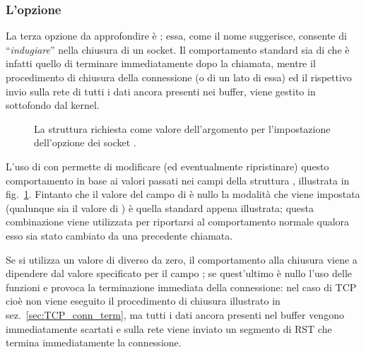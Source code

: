 


\subsubsection{L'opzione }

La terza opzione da approfondire è ; essa, come il nome
suggerisce, consente di ``\textsl{indugiare}'' nella chiusura di un socket. Il
comportamento standard sia di  che  è infatti
quello di terminare immediatamente dopo la chiamata, mentre il procedimento di
chiusura della connessione (o di un lato di essa) ed il rispettivo invio sulla
rete di tutti i dati ancora presenti nei buffer, viene gestito in sottofondo
dal kernel.

\begin{figure}[!htb]
  \footnotesize \centering
  \begin{minipage}[c]{0.80\textwidth}
  \end{minipage}
  \caption{La struttura  richiesta come valore dell'argomento
     per l'impostazione dell'opzione dei socket
    .}
  \label{fig:sock_linger_struct}
\end{figure}

L'uso di  con  permette di modificare (ed
eventualmente ripristinare) questo comportamento in base ai valori passati nei
campi della struttura , illustrata in
fig.~\ref{fig:sock_linger_struct}.  Fintanto che il valore del campo
 di  è nullo la modalità che viene impostata
(qualunque sia il valore di ) è quella standard appena
illustrata; questa combinazione viene utilizzata per riportarsi al
comportamento normale qualora esso sia stato cambiato da una precedente
chiamata.

Se si utilizza un valore di  diverso da zero, il comportamento
alla chiusura viene a dipendere dal valore specificato per il campo
; se quest'ultimo è nullo l'uso delle funzioni  e
 provoca la terminazione immediata della connessione: nel caso
di TCP cioè non viene eseguito il procedimento di chiusura illustrato in
sez.~\ref{sec:TCP_conn_term}, ma tutti i dati ancora presenti nel buffer
vengono immediatamente scartati e sulla rete viene inviato un segmento di RST
che termina immediatamente la connessione.

